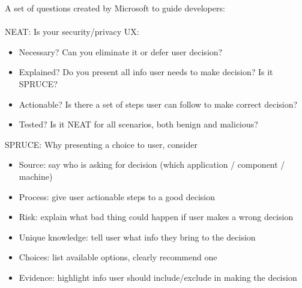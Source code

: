A set of questions created by Microsoft to guide developers:
\\
\\
NEAT: Is your security/privacy UX:
	\begin{itemize}
		\item Necessary? Can you eliminate it or defer user decision?
		\item Explained? Do you present all info user needs to make decision? Is it SPRUCE?
		\item Actionable? Is there a set of steps user can follow to make correct decision?
		\item Tested? Is it NEAT for all scenarios, both benign and malicious?
	\end{itemize}
SPRUCE: Why presenting a choice to user, consider
	\begin{itemize}
		\item Source: say who is asking for decision (which application / component / machine)
		\item Process: give user actionable steps to a good decision
		\item Risk: explain what bad thing could happen if user makes a wrong decision
		\item Unique knowledge: tell user what info they bring to the decision
		\item Choices: list available options, clearly recommend one
		\item Evidence: highlight info user should include/exclude in making the decision
	\end{itemize}
	